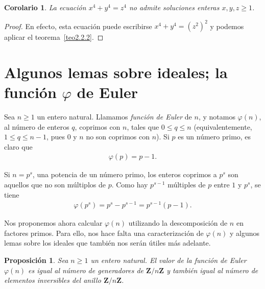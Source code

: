 \documentclass[10pt,oneside,bibtotoc,smallheadings,leqno,a5paper,DIV=12]{scrbook}
\newcommand{\ZZ}{\mathbf{Z}}
\numberwithin{equation}{section}
\theoremstyle{defi}
\theoremstyle{enonce}
\newtheorem{proposition}{Proposici\'on}
\newtheorem*{corollary*}{Corolario}
\theoremstyle{rem}
\numberwithin{theorem}{section}
\numberwithin{proposition}{section}
\numberwithin{definition}{section}
\numberwithin{lemma}{section}
\numberwithin{corollary}{section}
\numberwithin{example}{section}
\numberwithin{footnote}{section}%
\begin{document}
\begin{corollary*}
La ecuaci\'on $x^{4}+y^{4}=z^{4}$ no admite soluciones enteras $x,y,z\geq 1$.
\end{corollary*}

\begin{proof}
En efecto, esta ecuaci\'on puede escribirse $x^{4}+y^{4}=(z^{2})^{2}$ y podemos aplicar el teorema~\ref{teo2.2.2}.
\end{proof}

\section{Algunos lemas sobre ideales; la funci\'on $\varphi$ de Euler}\label{sec1.3}

Sea $n\geq 1$ un entero natural. Llamamos {\em funci\'on de Euler} de
$n$, y notamos $\varphi(n)$, al n\'umero de enteros $q$, coprimos con $n$, tales que
$0\leq q\leq n$ (equivalentemente, $1\leq q\leq n-1$, pues $0$ y $n$ no son
coprimos con $n$). Si $p$ es un n\'umero primo, es claro que
\begin{gather}
\varphi(p) = p-1.
\end{gather}

Si $n = p^{s}$, una potencia de un n\'umero primo, los enteros coprimos a $p^{s}$ son
aquellos que no son m\'ultiplos de $p$. Como hay $p^{s-1}$ m\'ultiples de $p$ entre $1$ y
$p^{s}$, se tiene
\begin{gather}\label{eq-1.3-2}
\varphi(p^{s}) = p^{s} - p^{s-1} = p^{s-1}(p-1).
\end{gather}

Nos proponemos ahora calcular $\varphi(n)$ utilizando la descomposici\'on de $n$
en factores primos. Para ello, nos hace falta una caracterizaci\'on de $\varphi(n)$ y
algunos lemas sobre los ideales que tambi\'en nos ser\'an \'utiles m\'as adelante.

\begin{proposition}\label{prop1.3.1}
Sea $n\geq 1$ un entero natural. El valor de la funci\'on de Euler $\varphi(n)$ es igual al n\'umero
de generadores de $\ZZ/n\ZZ$ y tambi\'en igual al n\'umero de elementos inversibles del
anillo $\ZZ/n\ZZ$.
\end{proposition}
\end{document}
